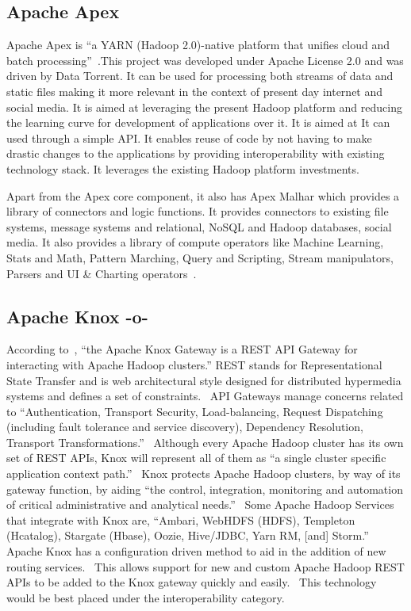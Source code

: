 \subsection{Apache Apex}
     
Apache Apex is ``a YARN (Hadoop 2.0)-native platform that unifies
cloud and batch processing''~\cite{www-apacheapexwiki}.This project
was developed under Apache License 2.0 and was driven by Data
Torrent. It can be used for processing both streams of data and static
files making it more relevant in the context of present day internet
and social media. It is aimed at leveraging the present Hadoop
platform and reducing the learning curve for development of
applications over it. It is aimed at It can used through a simple
API. It enables reuse of code by not having to make drastic changes to
the applications by providing interoperability with existing
technology stack. It leverages the existing Hadoop platform
investments.

Apart from the Apex core component, it also has Apex Malhar which
provides a library of connectors and logic functions. It provides
connectors to existing file systems, message systems and relational,
NoSQL and Hadoop databases, social media. It also provides a library
of compute operators like Machine Learning, Stats and Math, Pattern
Marching, Query and Scripting, Stream manipulators, Parsers and UI \&
Charting operators~\cite{www-apacheapexblog}.

\subsection{Apache Knox -o-}

According to~\cite{knox}, ``the Apache Knox Gateway is a REST API
Gateway for interacting with Apache Hadoop clusters.'' REST stands for
Representational State Transfer and is web architectural style
designed for distributed hypermedia systems and defines a set of
constraints.~\cite{fielding} API Gateways manage concerns related to
``Authentication, Transport Security, Load-balancing, Request
Dispatching (including fault tolerance and service discovery),
Dependency Resolution, Transport Transformations.''~\cite{peyrott}
Although every Apache Hadoop cluster has its own set of REST APIs,
Knox will represent all of them as ``a single cluster specific
application context path.''~\cite{knox} Knox protects Apache Hadoop
clusters, by way of its gateway function, by aiding ``the control,
integration, monitoring and automation of critical administrative and
analytical needs.''~\cite{knox} Some Apache Hadoop Services that
integrate with Knox are, ``Ambari, WebHDFS (HDFS), Templeton
(Hcatalog), Stargate (Hbase), Oozie, Hive/JDBC, Yarn RM, [and]
Storm.''~\cite{knox} Apache Knox has a configuration driven method to
aid in the addition of new routing services.~\cite{knox} This allows
support for new and custom Apache Hadoop REST APIs to be added to the
Knox gateway quickly and easily.~\cite{knox} This technology would be
best placed under the interoperability category.

